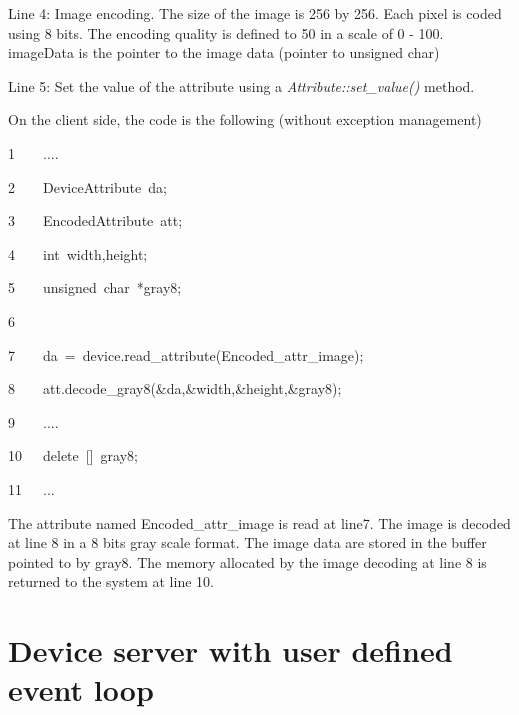 Line 4: Image encoding. The size of the image is 256 by 256. Each
pixel is coded using 8 bits. The encoding quality is defined to 50
in a scale of 0 - 100. imageData is the pointer to the image data
(pointer to unsigned char)

Line 5: Set the value of the attribute using a \emph{Attribute::set\_value()}
method.

On the client side, the code is the following (without exception management)


\begin{lyxcode}
1~~~~....

2~~~~DeviceAttribute~da;

3~~~~EncodedAttribute~att;

4~~~~int~width,height;

5~~~~unsigned~char~{*}gray8;

6~~~~~~

7~~~~da~=~device.read\_attribute(\textquotedbl{}Encoded\_attr\_image\textquotedbl{});

8~~~~att.decode\_gray8(\&da,\&width,\&height,\&gray8);

9~~~~....

10~~~delete~{[}{]}~gray8;

11~~~...
\end{lyxcode}


The attribute named Encoded\_attr\_image is read at line7. The image
is decoded at line 8 in a 8 bits gray scale format. The image data
are stored in the buffer pointed to by \textquotedbl{}gray8\textquotedbl{}.
The memory allocated by the image decoding at line 8 is returned to
the system at line 10.


\section{Device server with user defined event loop}

